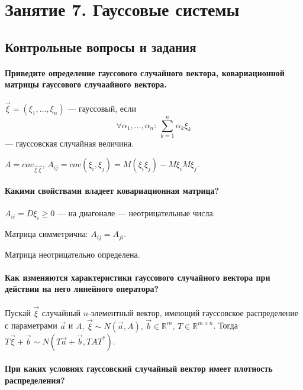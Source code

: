 \chapter*{Занятие 7. Гауссовые системы}

\section*{Контрольные вопросы и задания}

\subsubsection*{Приведите определение гауссового случайного вектора,
                ковариационной матрицы гауссового случаайного вектора.}

$ \vec{ \xi } = \left( \xi_1, \dotsc, \xi_n \right) $ --- гауссовый, если
$$ \forall \alpha_1, \dotsc, \alpha_n: \,
  \sum \limits_{k = 1}^n \alpha_k \xi_k$$
--- гауссовская случайная величина.

$A = cov_{ \vec{ \xi } \vec{ \xi }}, \,
  A_{ij} =
  cov \left( \xi_i, \xi_j \right) =
  M \left( \xi_i \xi_j \right) - M \xi_i M \xi_j$.

\subsubsection*{Какими свойствами владеет ковариационная матрица?}

$A_{ii} = D \xi_i \geq 0$ --- на диагонале --- неотрицательные числа.

Матрица симметрична: $A_{ij} = A_{ji}$.

Матрица неотрицательно определена.

\subsubsection*{Как изменяются характеристики гауссового случайного
                вектора при действии на него линейного оператора?}
Пускай $ \vec{ \xi }$ случайный $n$-элементный вектор,
имеющий гауссовское распределение с параметрами $ \vec{a}$ и
$A, \,
  \vec{ \xi } \sim N \left( \vec{a}, A \right), \,
  \vec{b} \in \mathbb{R}^m, \,
  T \in \mathbb{R}^{m \times n}$.
Тогда $T \vec{ \xi } + \vec{b} \sim N \left( T \vec{a} + \vec{b}, TAT^* \right) $.

\subsubsection*{При каких условиях гауссовский случайный вектор имеет плотность распределения?}

